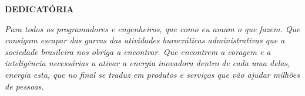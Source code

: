 \begin{dedicatoria}
\begin{center}
\textbf{DEDICATÓRIA}\\  
\end{center}

\vspace*{\fill}


\begin{flushright}
 \textit{
 Para todos os programadores e engenheiros, 
 que como eu amam o que fazem. 
 Que consigam escapar das garras das atividades burocráticas administrativas 
 que a sociedade brasileira nos obriga a encontrar. 
 Que encontrem a coragem e a inteligência necessárias a ativar a energia inovadora dentro de cada uma delas, 
 energia esta, que no final se traduz em produtos e serviços que vão ajudar milhões de pessoas.} 
  

\end{flushright}


\end{dedicatoria}
